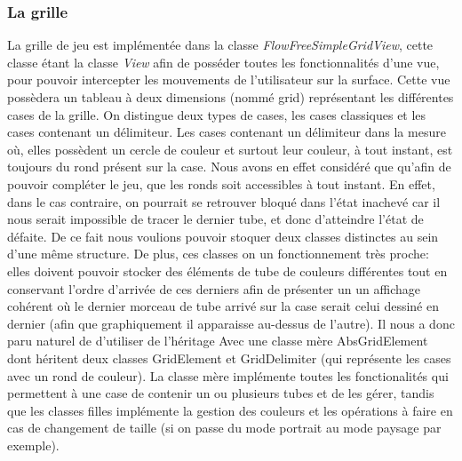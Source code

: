 \documentclass[12pt, a4paper]{article}%
\begin{document}
    \subsubsection{La grille}
    La grille de jeu est implémentée dans la classe \textit{FlowFreeSimpleGridView}, cette classe étant la classe \textit{View}
afin de posséder toutes les fonctionnalités d'une vue, pour pouvoir intercepter les mouvements de l'utilisateur sur la surface.
Cette vue possèdera un tableau à deux dimensions (nommé grid) représentant les différentes cases de la grille. On distingue deux
types de cases, les cases classiques et les cases contenant un délimiteur. Les cases contenant un délimiteur dans la mesure où,
elles possèdent un cercle de couleur et surtout leur couleur, à tout instant, est toujours du rond présent sur la case. Nous avons
en effet considéré que qu'afin de pouvoir compléter le jeu, que les ronds soit accessibles à tout instant. En effet, dans le cas
contraire, on pourrait se retrouver bloqué dans l'état inachevé car il nous serait impossible de tracer le dernier tube, et donc
d'atteindre l'état de défaite. De ce fait nous voulions pouvoir stoquer deux classes distinctes au sein d'une même structure. De
plus, ces classes on un fonctionnement très proche: elles doivent pouvoir stocker des éléments de tube de couleurs différentes
tout en conservant l'ordre d'arrivée de ces derniers afin de présenter un un affichage cohérent où le dernier morceau de tube
arrivé sur la case serait celui dessiné en dernier (afin que graphiquement il apparaisse au-dessus de l'autre). Il nous a donc
paru naturel de d'utiliser de l'héritage Avec une classe mère AbsGridElement dont héritent deux classes GridElement et
GridDelimiter (qui représente les cases avec un rond de couleur). La classe mère implémente toutes les fonctionalités qui
permettent à une case de contenir un ou plusieurs tubes et de les gérer, tandis que les classes filles implémente la gestion des
couleurs et les opérations à faire en cas de changement de taille (si on passe du mode portrait au mode paysage par exemple).
\end{document}

